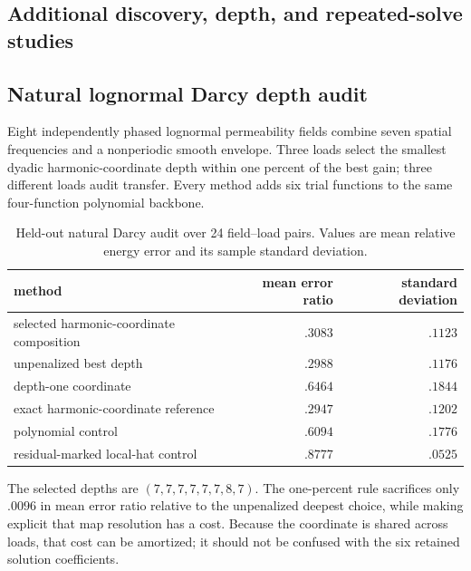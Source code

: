 \documentclass[11pt]{article}
\numberwithin{algorithm}{section}
\theoremstyle{definition}\newtheorem{definition}[theorem]{Definition}
\theoremstyle{remark}\newtheorem{remark}[theorem]{Remark}
\begin{document}
\subsection{Additional discovery, depth, and repeated-solve studies}
\storednumericsF

\subsection{Natural lognormal Darcy depth audit}
\label{app:natural-darcy-depth}
Eight independently phased lognormal permeability fields combine seven
spatial frequencies and a nonperiodic smooth envelope.  Three loads select
the smallest dyadic harmonic-coordinate depth within one percent of the best
gain; three different loads audit transfer.  Every method adds six trial
functions to the same four-function polynomial backbone.
\begin{table}[H]
\centering
\caption{Held-out natural Darcy audit over 24 field--load pairs.  Values are
mean relative energy error and its sample standard deviation.}
\begin{tabular}{lrr}
\toprule
method & mean error ratio & standard deviation\\
\midrule
selected harmonic-coordinate composition & $.3083$ & $.1123$\\
unpenalized best depth & $.2988$ & $.1176$\\
depth-one coordinate & $.6464$ & $.1844$\\
exact harmonic-coordinate reference & $.2947$ & $.1202$\\
polynomial control & $.6094$ & $.1776$\\
residual-marked local-hat control & $.8777$ & $.0525$\\
\bottomrule
\end{tabular}
\end{table}
The selected depths are $(7,7,7,7,7,7,8,7)$.  The one-percent rule sacrifices
only $.0096$ in mean error ratio relative to the unpenalized deepest choice,
while making explicit that map resolution has a cost.  Because the coordinate
is shared across loads, that cost can be amortized; it should not be confused
with the six retained solution coefficients.
\end{document}
